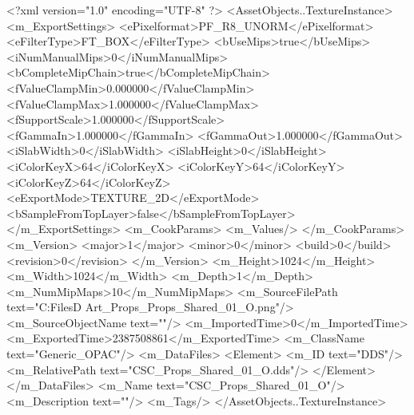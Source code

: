 <?xml version="1.0" encoding="UTF-8" ?>
<AssetObjects..TextureInstance>
	<m_ExportSettings>
		<ePixelformat>PF_R8_UNORM</ePixelformat>
		<eFilterType>FT_BOX</eFilterType>
		<bUseMips>true</bUseMips>
		<iNumManualMips>0</iNumManualMips>
		<bCompleteMipChain>true</bCompleteMipChain>
		<fValueClampMin>0.000000</fValueClampMin>
		<fValueClampMax>1.000000</fValueClampMax>
		<fSupportScale>1.000000</fSupportScale>
		<fGammaIn>1.000000</fGammaIn>
		<fGammaOut>1.000000</fGammaOut>
		<iSlabWidth>0</iSlabWidth>
		<iSlabHeight>0</iSlabHeight>
		<iColorKeyX>64</iColorKeyX>
		<iColorKeyY>64</iColorKeyY>
		<iColorKeyZ>64</iColorKeyZ>
		<eExportMode>TEXTURE_2D</eExportMode>
		<bSampleFromTopLayer>false</bSampleFromTopLayer>
	</m_ExportSettings>
	<m_CookParams>
		<m_Values/>
	</m_CookParams>
	<m_Version>
		<major>1</major>
		<minor>0</minor>
		<build>0</build>
		<revision>0</revision>
	</m_Version>
	<m_Height>1024</m_Height>
	<m_Width>1024</m_Width>
	<m_Depth>1</m_Depth>
	<m_NumMipMaps>10</m_NumMipMaps>
	<m_SourceFilePath text="C:\Users\Shadow\Desktop\Working Files\3D Art\Textures\CSC_Props\Current\textures\CSC_Props_Shared_01_O.png"/>
	<m_SourceObjectName text=""/>
	<m_ImportedTime>0</m_ImportedTime>
	<m_ExportedTime>2387508861</m_ExportedTime>
	<m_ClassName text="Generic_OPAC"/>
	<m_DataFiles>
		<Element>
			<m_ID text="DDS"/>
			<m_RelativePath text="CSC_Props_Shared_01_O.dds"/>
		</Element>
	</m_DataFiles>
	<m_Name text="CSC_Props_Shared_01_O"/>
	<m_Description text=""/>
	<m_Tags/>
</AssetObjects..TextureInstance>

